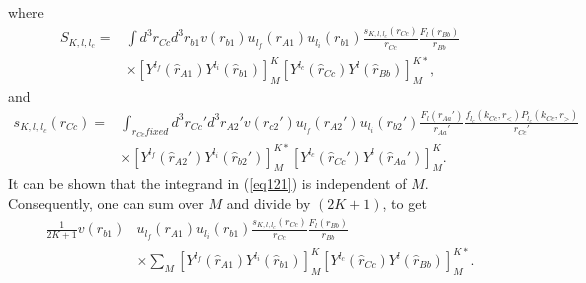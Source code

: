 where
\begin{equation}\label{eq121}
 \begin{split}
S_{K,l,l_c}=&\int d^3 r_{Cc}d^3 r_{b1} v(r_{b1}) u_{l_f}(r_{A1})u_{l_i}(r_{b1})\frac{s_{K,l,l_c}(r_{Cc})}{r_{Cc}}\frac{F_l(r_{Bb})}{r_{Bb}} \\
& \times \left[ Y ^{l_f} (\hat r_{A1}) Y ^{l_i} (\hat r_{b1}) \right] _{M}^{K}
\left[Y ^{l_c} (\hat r_{Cc}) Y^{l} (\hat r_{Bb})  \right]^{K*}_{M},
 \end{split}
\end{equation}
and
\begin{equation}\label{eq122}
 \begin{split}
s_{K,l,l_c}(r_{Cc})=&\int_{r_{Cc}fixed} d^3 r_{Cc}'d^3 r_{A2}' v(r_{c2}') u_{l_f}(r_{A2}')u_{l_i}(r_{b2}') \frac{F_l(r_{Aa}')}{r_{Aa}'}\frac{f_{l_c}(k_{Cc},r_<)P_{l_c}(k_{Cc},r_>)}{r_{Cc}'}\\
& \times \left[ Y ^{l_f} (\hat r_{A2}') Y ^{l_i} (\hat r_{b2}') \right] _{M}^{K*}
\left[Y ^{l_c} (\hat r_{Cc}') Y^{l} (\hat r_{Aa}')  \right]^{K}_{M}.
 \end{split}
\end{equation}
It can be shown that the integrand in (\ref{eq121}) is independent of $M$. Consequently, one can sum over $M$ and divide by $(2K+1)$, to get
\begin{equation}\label{eq123}
 \begin{split}
 \frac{1}{2K+1}v(r_{b1})& u_{l_f}(r_{A1})u_{l_i}(r_{b1})\frac{s_{K,l,l_c}(r_{Cc})}{r_{Cc}}\frac{F_l(r_{Bb})}{r_{Bb}}\\
 &\times \sum_M \left[ Y ^{l_f} (\hat r_{A1}) Y ^{l_i} (\hat r_{b1}) \right] _{M}^{K}
\left[Y ^{l_c} (\hat r_{Cc}) Y^{l} (\hat r_{Bb})  \right]^{K*}_{M} .
 \end{split}
\end{equation}

